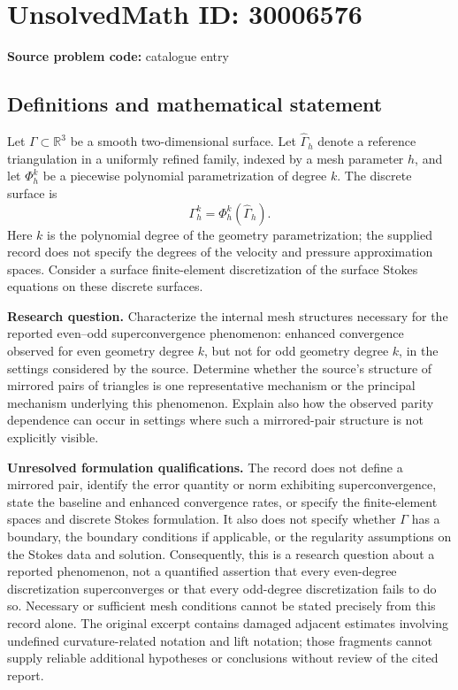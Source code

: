 \documentclass[11pt]{article}
\newcommand{\R}{\mathbb{R}}
\begin{document}
\section*{UnsolvedMath ID: 30006576}
\textbf{Source problem code:} catalogue entry
\subsection{Definitions and mathematical statement}
Let \(\Gamma\subset\R^3\) be a smooth two-dimensional surface. Let \(\widehat\Gamma_h\) denote a reference triangulation in a uniformly refined family, indexed by a mesh parameter \(h\), and let \(\Phi_h^k\) be a piecewise polynomial parametrization of degree \(k\). The discrete surface is
\[
\Gamma_h^k=\Phi_h^k(\widehat\Gamma_h).
\]
Here \(k\) is the polynomial degree of the geometry parametrization; the supplied record does not specify the degrees of the velocity and pressure approximation spaces. Consider a surface finite-element discretization of the surface Stokes equations on these discrete surfaces.

\textbf{Research question.} Characterize the internal mesh structures necessary for the reported even--odd superconvergence phenomenon: enhanced convergence observed for even geometry degree \(k\), but not for odd geometry degree \(k\), in the settings considered by the source. Determine whether the source's structure of mirrored pairs of triangles is one representative mechanism or the principal mechanism underlying this phenomenon. Explain also how the observed parity dependence can occur in settings where such a mirrored-pair structure is not explicitly visible.

\textbf{Unresolved formulation qualifications.} The record does not define a mirrored pair, identify the error quantity or norm exhibiting superconvergence, state the baseline and enhanced convergence rates, or specify the finite-element spaces and discrete Stokes formulation. It also does not specify whether \(\Gamma\) has a boundary, the boundary conditions if applicable, or the regularity assumptions on the Stokes data and solution. Consequently, this is a research question about a reported phenomenon, not a quantified assertion that every even-degree discretization superconverges or that every odd-degree discretization fails to do so. Necessary or sufficient mesh conditions cannot be stated precisely from this record alone. The original excerpt contains damaged adjacent estimates involving undefined curvature-related notation and lift notation; those fragments cannot supply reliable additional hypotheses or conclusions without review of the cited report.
\end{document}
